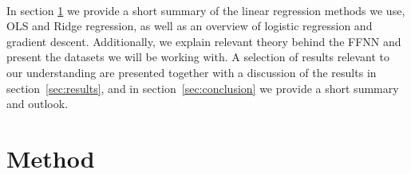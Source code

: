 \documentclass[english,notitlepage,reprint,nofootinbib]{revtex4–2}  %
\begin{document}
\vspace{3mm}
\\
In section \ref{sec:methods} we provide a short summary of the linear regression methods we use, OLS and Ridge regression, as well as an overview of logistic regression and gradient descent. Additionally, we explain relevant theory behind the FFNN and present the datasets we will be working with. 
A selection of results relevant to our understanding are presented together with a discussion of the results in section~\ref{sec:results}, 
and in section~\ref{sec:conclusion} we provide a short summary and outlook. 


\section{Method}\label{sec:methods}
\end{document}
